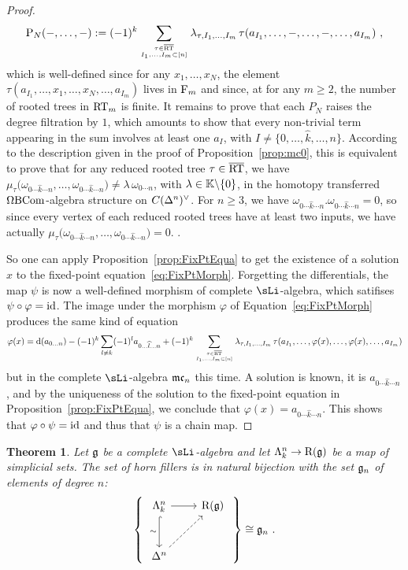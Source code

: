 \documentclass[twoside, 10pt]{amsart}
\newtheorem{theorem}[lemma]{Theorem}
\begin{document}
\begin{proof}
\[
\PP_N(-, \ldots, -):=
(-1)^k \sum_{\tau \in \overline{\RT}\atop I_1, \ldots, I_m\subset[n]}\lambda_{\tau, I_1, \ldots, I_m}\, \tau(a_{I_1}, \ldots, -, \ldots, -, \ldots, a_{I_m})\ , 
\]
which is well-defined since for any $x_1, \ldots, x_N$, the element $\tau(a_{I_1}, \ldots, x_1, \ldots, x_N, \ldots, a_{I_m})$ lives in $\F_m$ and since, at for any  $m\geqslant  2$, the number of rooted trees in $\RT_m$ is finite. 
It remains to prove that each $P_N$ raises the degree filtration by $1$, which amounts to show that every non-trivial term appearing in the sum involves at least one $a_I$, with $I\neq\{0, \ldots, \widehat{k}, \ldots, n\}$. According to the  description given in the proof of Proposition~\ref{prop:mc0}, this is equivalent to prove that for any reduced rooted tree $\tau\in \overline{\RT}$, we have $\mu_\tau\big(\omega_{0 \cdots \widehat{k}\cdots n}, \ldots, \omega_{0 \cdots \widehat{k}\cdots n}\big)\neq \lambda\, \omega_{0 \cdots n}$, with $\lambda\in \k\backslash \{0\}$, in the homotopy transferred $\Cobar \Bar \com$-algebra structure on $C(\De{n})^\vee$. For $n\geqslant 3$, we have $\omega_{0 \cdots \widehat{k}\cdots n}.\omega_{0 \cdots \widehat{k}\cdots n}=0$, so since every vertex of each reduced rooted trees have at least two inputs, we have 
actually $\mu_\tau\big(\omega_{0 \cdots \widehat{k}\cdots n}, \ldots, \omega_{0 \cdots \widehat{k}\cdots n}\big)=0$. 
. 

So one can apply Proposition~\ref{prop:FixPtEqua} to get the existence of a solution $x$ to the fixed-point equation~\eqref{eq:FixPtMorph}. Forgetting the differentials, the map $\psi$ is now a well-defined morphism of complete $\sLi$-algebra, which satifises $\psi\circ \varphi=\id$. The image under the morphism $\varphi$ of Equation~\eqref{eq:FixPtMorph} produces the same kind of equation
\[
\varphi(x)=\d(a_{0\ldots n})-(-1)^k\sum_{l\neq k} (-1)^l a_{0\ldots \widehat{l} \ldots n} +(-1)^k \sum_{\tau \in \overline{\RT}\atop I_1, \ldots, I_m\subset[n]}\lambda_{\tau, I_1, \ldots, I_m}\, \tau(a_{I_1}, \ldots, \varphi(x), \ldots, \varphi(x), \ldots, a_{I_m})
\]
but in the complete $\sLi$-algebra $\mc_n$ this time. A solution is known, it is $a_{0 \cdots \widehat{k}\cdots n}$, and by the uniqueness of the solution to the fixed-point equation in Proposition~\ref{prop:FixPtEqua}, we conclude that 
$\varphi(x)=a_{0 \cdots \widehat{k}\cdots n}$. This shows that $\varphi\circ \psi=\id$ and thus that $\psi$ is a chain map. 
\end{proof}

\begin{theorem}\label{thm:KanExt}
Let $\g$ be a complete $\sLi$-algebra and let $\Ho{k}{n} \to \R(\g)$ be a map of simplicial sets. 
The set of horn fillers  is in natural bijection with the set $\g_n$ of elements of degree $n$: 
\[
\left\{\vcenter{\hbox{
\begin{tikzcd}[column sep=0.8cm, row sep=1cm]
\Ho{k}{n}
\arrow[d, hookrightarrow, "\sim"']
\arrow[r]
& \R(\g)
\\
\De{n} \arrow[ur, dashrightarrow] 
&\end{tikzcd}
}}\right\} 
\cong \g_n\ .
\]
\end{theorem}
\end{document}

